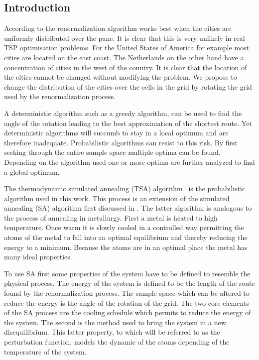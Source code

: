 \subsection{Introduction}
According to \cite{yoshiyuki1995nms} the renormalization algorithm works best
when the cities are uniformly distributed over the pane. It is clear that this
is very unlikely in real TSP optimisation problems. For the United States of
America for example most cities are located on the east coast. The Netherlands
on the other hand have a concentration of cities in the west of the country.
It is clear that the location of the cities cannot be changed without
modifying the problem. We propose to change the distribution of the cities
over the cells in the grid by rotating the grid used by the renormalization
process.

A deterministic algorithm such as a greedy algorithm, can be used to find the
angle of the rotation leading to the best approximation of the shortest route. Yet
deterministic algorithms will succumb to stay in a local optimum and are
therefore inadequate. Probabilistic algorithms can resist to this risk. By
first seeking through the entire sample space multiple optima can be found.
Depending on the algorithm used one or more optima are further analyzed to
find a global optimum.

The thermodynamic simulated annealing (TSA) algorithm
\cite{devicente2003pts}~is the probabilistic algorithm used in this work. This
process is an extension of the simulated annealing (SA) algorithm first
discussed in \cite{kirkpatrick83}. The latter algorithm is analogous to the
process of annealing in metallurgy. First a metal is heated to high
temperature. Once warm it is slowly cooled in a controlled way permitting the
atoms of the metal to fall into an optimal equilibrium and thereby reducing
the energy to a minimum. Because the atoms are in an optimal place the metal
has many ideal properties. 

To use SA first some properties of the system have to be defined to resemble
the physical process. The energy of the system is defined to be the length of
the route found by the renormalization process. The sample space which can be
altered to reduce the energy is the angle of the rotation of the grid.  The
two core elements of the SA process are the cooling schedule which permits to
reduce the energy of the system. The second is the method used to bring the
system in a new disequilibrium. This latter property, to which will be
referred to as the perturbation function, models the dynamic of the atoms
depending of the temperature of the system.

